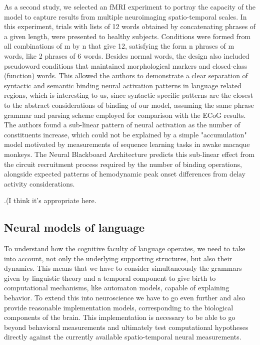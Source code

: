 \documentclass[10pt]{article}
\newcommand{\noteCP}[1]{}
\newcommand{\noteMP}[3]{(}
\newcommand{\notenewMdK}[2]{(MdK: \textcolor{purple}{#1})}
\begin{document}
As a second study, we selected an fMRI experiment \cite{Pallier_2011} to portray the capacity of the model to capture results from multiple neuroimaging spatio-temporal scales.
In this experiment, trials with lists of 12 words obtained by concatenating phrases of a given length, were presented to healthy subjects.
Conditions were formed from all combinations of m by n that give 12, satisfying the form n phrases of m words, like 2 phrases of 6 words.
Besides normal words, the design also included pseudoword conditions that maintained morphological markers and closed-class (function) words.
This allowed the authors to demonstrate a clear separation of syntactic and semantic binding neural activation patterns in language related regions, which is interesting to us, 
since syntactic specific patterns are the closest to the abstract considerations of binding of our model, assuming the same phrase grammar and parsing scheme employed for 
comparison with the ECoG results.
The authors found a sub-linear pattern of neural activation as the number of constituents increase, which could not be explained by a simple "accumulation" model motivated by 
measurements of sequence learning tasks in awake macaque monkeys.
The Neural Blackboard Architecture predicts this sub-linear effect from the circuit recruitment process required by the number of binding operations, 
alongside expected patterns of hemodynamic peak onset differences from delay activity considerations.

\noteCP{I would not say that. A simplistic model made the linear prediction. It relied on assumption that of very sparse representations and superposition. A tiny modif saying that the representation are not so sparse (~20\% of neurons in an assembly)  predicts the sublinear effect.}.\noteMP{I changed the wording. Now I just try to point out that is not trivial to explain the sublinear effect from simpler models and that our model captures the effect. Also I clarify what explains them in the model, maybe its too soon for that?}.
\notenewMdK{I think it's appropriate here.}

\subsection{Neural models of language}

{\label{619233}}

To understand how the cognitive faculty of language operates, we need to take into account, not only the underlying supporting structures, but also their dynamics. 
This means that we have to consider simultaneously the grammars given by linguistic theory and a temporal component to give birth to computational mechanisms, like 
automaton models, capable of explaining behavior\cite{hale2014automaton}.
To extend this into neuroscience we have to go even further and also provide reasonable implementation models, corresponding to the biological components of the brain.
This implementation is necessary to be able to go beyond behavioral measurements and ultimately test computational hypotheses directly against the currently available spatio-temporal neural measurements.
\end{document}
